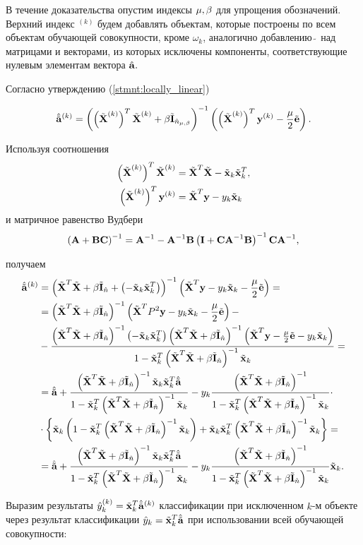 \begin{Proof}
\def\this{^{(k)}}
В течение доказательства опустим индексы ${\mu,\beta}$ для упрощения обозначений. 
Верхний индекс ${}\this$ будем добавлять объектам, которые построены по всем объектам обучающей совокупности, кроме $\omega_k$, аналогично добавлению $\tilde{\:}$ над матрицами и векторами, из которых исключены компоненты, соответствующие нулевым элементам вектора $\hat{\boldsymbol{\mathbf{a}}}.$

Согласно утверждению (\ref{stmnt:locally_linear})

\begin{equation*}
	\besta^{(k)}
		= \cbr{\cbr{\tilde{\mb X}\this}^T \tilde{\mb X}\this + \beta \tilde{\mb I}_{\hat n_\lams}}^{-1}\cbr{\cbr{\tilde{\mb X}\this}^T \mb y^{(k)} -\frac\mu2\tilde{\mb e}}.
\end{equation*}

Используя соотношения
\begin{align*}
	\cbr{\tilde {\mb X}\this}^T \tilde{\mb X}\this
		&= \tilde{\mb X}^T \tilde{\mb X} - \tilde{\mb x}_k \tilde{\mb x}_k^T, \\
	\cbr{\tilde {\mb X}\this}^T \mb y^{(k)}
		&= \tilde{\mb X}^T \mb y - y_k \tilde{\mb x}_k
\end{align*}
и матричное равенство Вудбери
\begin{equation*}
	\left(\boldsymbol{\mathbf{A}}+\boldsymbol{\mathbf{B}} \boldsymbol{\mathbf{C}}\right)^{-1} = \boldsymbol{\mathbf{A}}^{-1} - \boldsymbol{\mathbf{A}}^{-1} \boldsymbol{\mathbf{B}}\left(\boldsymbol{\mathbf{I}} + \boldsymbol{\mathbf{C}} \boldsymbol{\mathbf{A}}^{-1} \boldsymbol{\mathbf{B}}\right)^{-1} \boldsymbol{\mathbf{C}} \boldsymbol{\mathbf{A}}^{-1},
\end{equation*}

получаем
\begin{align*}
	\besta\this
		&= \inv{\A + \cbr{- \xxt}}
		\cbr{\tilde{\mb X}^T \mb y - y_k\tilde{\mb x}_k -\frac\mu2\tilde{\mb e}} = \\
		&= \inv{\A} \cbr{\tilde{\mb X}^T P^2\mb y - y_k\tilde{\mb x}_k -\frac\mu2\tilde{\mb e}} - \\
		&- \frac{\inv{\A}\cbr{-\xxt}\inv{\A}\cbr{\tilde{\mb X}^T \mb y  -\frac\mu2\tilde{\mb e} - y_k\tilde{\mb x}_k}}{\denominator} = \\
		&= \besta + \frac{\inv{\A}\xxt\besta}{\denominator}
		- y_k\frac{\inv{\A}}{\denominator} \cdot \\
		&\cdot \fbr{\tilde{\mb x}_k\cbr{\denominator} + \xxt\inv{\A}\tilde{\mb x}_k} = \\
		&= \besta + \frac{\inv{\A}\xxt\besta}{\denominator} - y_k\frac{\inv{\A}}{\denominator}\tilde{\mb x}_k.
\end{align*}

Выразим результаты $\hat y\this_k = \tilde{\mb x}^T_k\besta\this$ классификации при исключенном $k$-м объекте через результат классификации $\hat y_k = \tilde{\boldsymbol{\mathbf{x}}}^T_k\hat{\tilde{\mathbf a}}$ при использовании всей обучающей совокупности:


\end{Proof}
